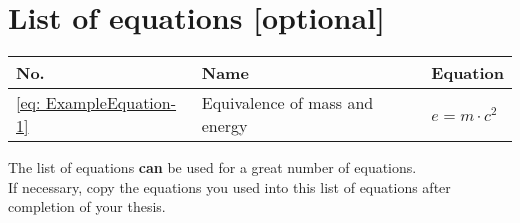 \chapter{List of equations [optional]}
\label{sec: ListOfEquations}

\begin{table}[h]
	\centering
	\begin{tabular}{|M{0.8cm}|m{2.8cm}|m{10.8cm}|}
		\hline
		\textbf{No.} & \textbf{Name} & \textbf{Equation} \\
		\hline
		\ref{eq: ExampleEquation-1} & Equivalence of mass and energy & $e=m\cdot c^2$ \\ 
		\hline
	\end{tabular}
\end{table}
\noindent The list of equations \textbf{can} be used for a great number of equations.
\vspace{6pt}\\
If necessary, copy the equations you used into this list of equations after completion of your thesis.
